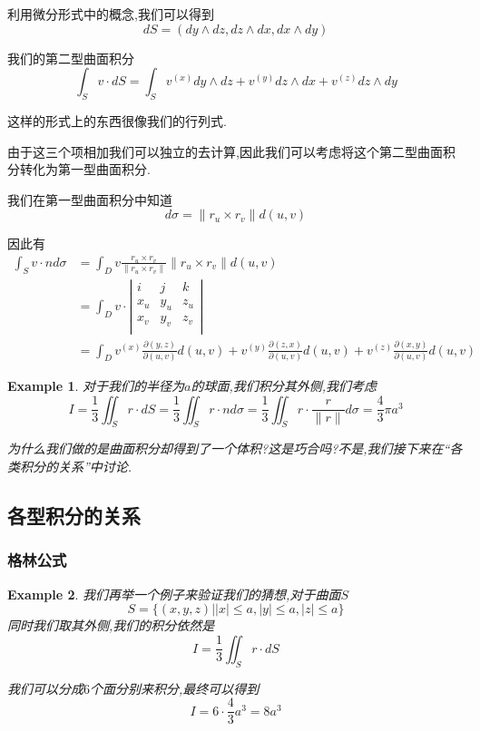 \documentclass[11pt,hyperref,a4paper,UTF8]{ctexart}
\newtheorem{example}{Example}[subsection]
\begin{document}
\begin{CJK}{UTF8}{gkai}
利用微分形式中的概念,我们可以得到
\[dS = (dy \wedge dz,dz \wedge dx, dx \wedge dy)\]

我们的第二型曲面积分
\[\int_S v \cdot dS = \int_S v^{(x)} dy \wedge dz + v^{(y)} dz \wedge dx + v^{(z)} dz \wedge dy\]

这样的形式上的东西很像我们的行列式.

由于这三个项相加我们可以独立的去计算,因此我们可以考虑将这个第二型曲面积分转化为第一型曲面积分.

我们在第一型曲面积分中知道
\[d\sigma = \|r_u \times r_v\| d(u,v)\]

因此有
\[
\begin{aligned}  
  \int_S v\cdot n d\sigma &= \int_D v \frac{r_u \times r_v}{\|r_u \times r_v\|} \|r_u\times r_v\| d(u,v)\\
  &= \int_D v \cdot \left|\begin{matrix}
    i & j & k\\
    x_u & y_u & z_u\\
    x_v & y_v & z_v\\
  \end{matrix}\right|\\
  &= \int_D v^{(x)} \frac{\partial(y,z)}{\partial(u,v)}d(u,v) + v^{(y)}\frac{\partial(z,x)}{\partial(u,v)}d(u,v) + v^{(z)}\frac{\partial(x,y)}{\partial(u,v)}d(u,v)
\end{aligned}  
\]

\begin{example}
  对于我们的半径为$a$的球面,我们积分其外侧,我们考虑
  \[I = \frac{1}{3} \iint_S r \cdot dS = \frac{1}{3} \iint_S r \cdot n d\sigma = \frac{1}{3} \iint_S r \cdot \frac{r}{\|r\|} d\sigma = \frac{4}{3}\pi a^3 \]

  为什么我们做的是曲面积分却得到了一个体积?这是巧合吗?不是,我们接下来在``各类积分的关系''中讨论.
\end{example}

\subsection{各型积分的关系}
\subsubsection{格林公式}
\begin{example}
  我们再举一个例子来验证我们的猜想,对于曲面$S$
  \[S = \{(x,y,z) | |x| \leq a,|y| \leq a, |z| \leq a\}\]
  同时我们取其外侧,我们的积分依然是
  \[I = \frac{1}{3}\iint_S r\cdot dS\]

  我们可以分成$6$个面分别来积分,最终可以得到
  \[I = 6 \cdot \frac{4}{3} a^3 = 8a^3\]
\end{example}


\end{CJK}
\end{document}

